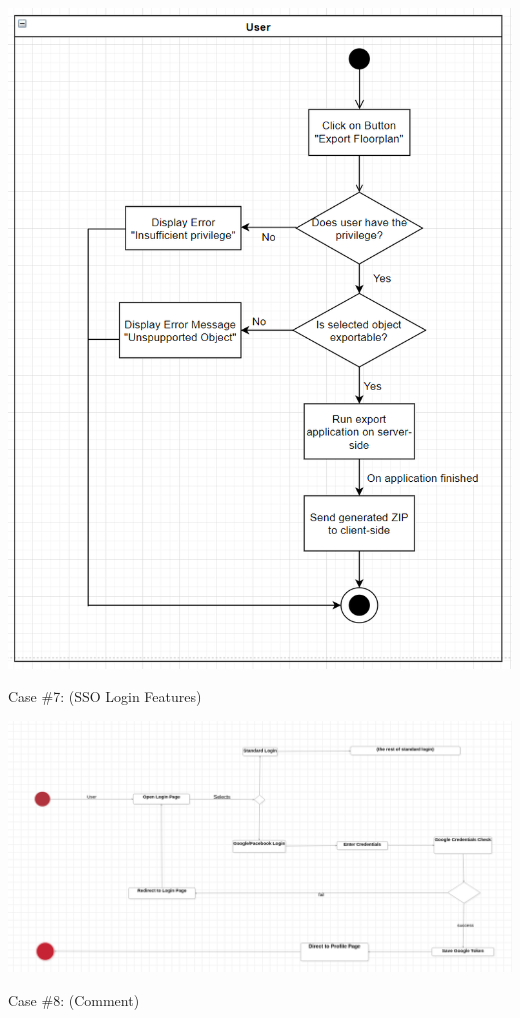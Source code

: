             \includegraphics[width=\textwidth]{images/case2.png}
        
			\noindent Case \#7:
			(SSO Login Features)
			
			\includegraphics[width=\textwidth]{images/sso.png}
		
	\noindent Case \#8:
	(Comment)
			
